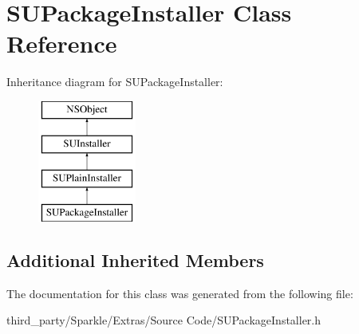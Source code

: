 \hypertarget{interface_s_u_package_installer}{}\section{S\+U\+Package\+Installer Class Reference}
\label{interface_s_u_package_installer}
Inheritance diagram for S\+U\+Package\+Installer\+:\begin{figure}[H]
\begin{center}
\leavevmode
\includegraphics[height=4.000000cm]{interface_s_u_package_installer}
\end{center}
\end{figure}
\subsection*{Additional Inherited Members}


The documentation for this class was generated from the following file\+:\begin{DoxyCompactItemize}
\item 
third\+\_\+party/\+Sparkle/\+Extras/\+Source Code/S\+U\+Package\+Installer.\+h\end{DoxyCompactItemize}

